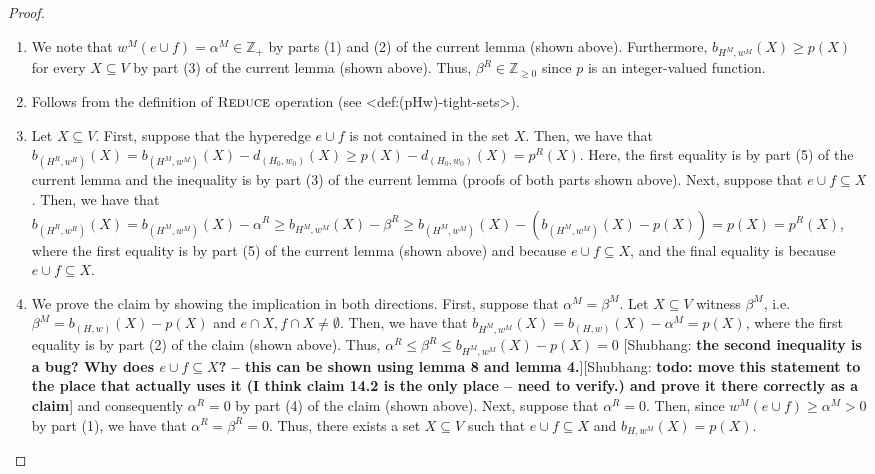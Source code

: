 \documentclass{article}
\def\Cref#1{<#1>}%
\newcommand{\tightSetFamily}[1]{\ensuremath{T_{#1}}\xspace}
\newcommand{\shubhang}[1]{{\color{blue}[{\tiny Shubhang: \bf #1}]\marginpar{\color{blue}*}}}
\newcommand{\maximalTightSetContainingHyperedge}[1]{\ensuremath{\tau_{#1}}\xspace}
\newcommand{\reduce}{\ensuremath{\textsc{Reduce}}\xspace}
\providecommand{\Z}{\mathbb{Z}}
\begin{document}
\begin{proof}
\begin{enumerate}
    \item We note that $w^M(e\cup f) = \alpha^M \in \Z_+$ by parts (1) and (2) of the current lemma (shown above). Furthermore, $b_{H^M,w^M}(X) \geq p(X)$ for every $X\subseteq V$ by part (3) of the current lemma (shown above). Thus, $\beta^R \in \Z_{\geq 0}$ since $p$ is an integer-valued function.

    \item Follows from the definition of \reduce operation (see \Cref{def:(pHw)-tight-sets}).

    \item Let $X\subseteq V$. First, suppose that the hyperedge $e\cup f$ is not contained in the set $X$. 
    Then, we have that $b_{(H^R, w^R)}(X) = b_{(H^M, w^M)}(X) - d_{(H_0, w_0)}(X) \geq p(X) - d_{(H_0, w_0)}(X) = p^R(X)$. Here, the first equality is by part (5) of the current lemma and the inequality is by part (3) of the current lemma (proofs of both parts shown above).  Next, suppose that $e\cup f \subseteq X$. Then, we have that $b_{(H^R, w^R)}(X) = b_{(H^M, w^M)}(X) - \alpha^R \geq b_{H^M,w^M}(X) - \beta^R \geq b_{(H^M, w^M)}(X) - (b_{(H^M, w^M)}(X) - p(X)) = p(X) = p^R(X)$, where the first equality is by part (5) of the current lemma (shown above) and because $e\cup f \subseteq X$, and the final equality is because $e\cup f \subseteq X$.
\iffalse
    \item We prove the claim by showing the implication in both directions.
    First, suppose that $\alpha^M = \beta^M$. Let $X \subseteq V$ witness $\beta^M$, i.e. $\beta^M = b_{(H,w)}(X) - p(X)$ and $e\cap X, f\cap X \not = \emptyset$. Then, we have that
    $b_{H^M,w^M}(X) = b_{(H,w)}(X) - \alpha^M = p(X)$, where the first equality is by part (2) of the claim (shown above). Thus, $\alpha^R \leq \beta^R \leq b_{H^M,w^M}(X) - p(X) = 0$ \shubhang{the second inequality is a bug? Why does $e\cup f \subseteq X$? -- this can be shown using lemma 8 and lemma 4.}\shubhang{todo: move this statement to the place that actually uses it (I think claim 14.2 is the only place -- need to verify.) and prove it there correctly as a claim} and consequently $\alpha^R = 0$ by part (4) of the claim (shown above). Next, suppose that $\alpha^R = 0$. Then, since $w^M(e\cup f) \geq \alpha^M > 0$ by part (1), we have that $\alpha^R = \beta^R = 0$. Thus, there exists a set $X \subseteq V$ such that $e\cup f \subseteq X$ and $b_{H,w^M}(X) = p(X)$. 

\end{enumerate}
\end{proof}
\end{document}
